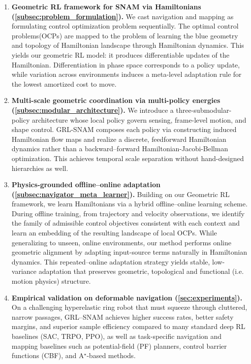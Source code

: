 \documentclass{article} %
\begin{document}
\begin{enumerate}
\item \textbf{Geometric RL framework for SNAM via Hamiltonians (\cref{subsec:problem_formulation}).}
We cast navigation and mapping as formulating  control optimization problem sequentially.
The optimal control problems(OCPs) are mapped to the problem of learning the blue geometry and topology of Hamiltonian landscape through Hamiltonian dynamics. This yields our geometric RL model: it produces differentiable updates of the Hamiltonian. Differentiation in phase space corresponds to a policy update, while variation across environments induces a meta-level adaptation rule {for the lowest amortized cost to move}.


\item \textbf{Multi-scale geometric coordination via multi-policy energies (\cref{subsec:modular_architecture}).}
We introduce a three-submodular-policy architecture whose local policy govern sensing, frame-level motion, and shape control. GRL-SNAM composes each policy via constructing induced Hamiltonian flow maps and realize a discrete, feedforward Hamiltonian dynamics rather than { a backward--forward Hamiltonian-Jacobi-Bellman  optimization}. This achieves temporal scale separation without hand-designed hierarchies as well.

\item \textbf{Physics-grounded offline--online adaptation (\cref{subsec:navigator_meta_learner}).}
Building on our Geometric RL framework, we learn { Hamiltonians via a hybrid offline--online learning scheme}. During offline training, from trajectory and velocity observations, we identify the family of admissible control objectives consistent with each context and learn an embedding of the resulting landscape of local OCPs. While generalizing to unseen, online environments, our method performs online geometric alignment by adapting input-source terms naturally in Hamiltonian dynamics. This { repeated--online} adaptation strategy yields stable, low-variance adaptation that preserves { geometric, topological and functional (i.e. motion physics)} structure.

\item \textbf{Empirical validation on deformable navigation (\cref{sec:experiments}).}
On a challenging hyperelastic ring robot that must squeeze through cluttered, narrow passages, GRL--SNAM achieves higher success rates, better safety margins, and superior sample efficiency compared to { many} standard deep RL baselines (SAC, {TRPO}, PPO), as well as task-specific navigation and mapping baselines such as potential-field (PF) planners, control barrier functions (CBF), and A$^{\star}$-based methods. 
\end{enumerate}
\end{document}
